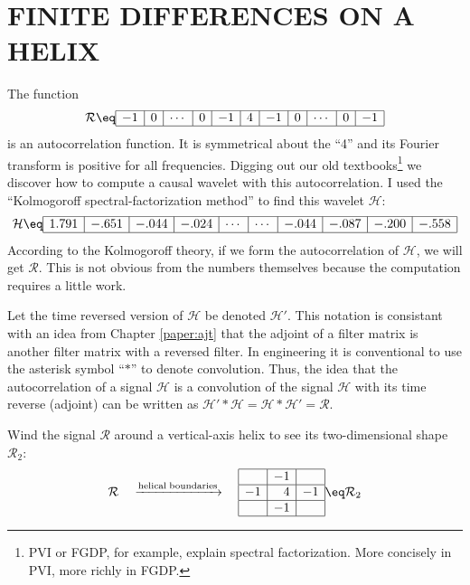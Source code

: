 \section{FINITE DIFFERENCES ON A HELIX}
The function
\begin{equation}
\label{eqn:2dlapin1d}
\mathcal{R}
\eq
\begin{array}{|r|r|r|r|r|r|r|r|r|r|r|r|r|r|r|} \hline
-1&0&\cdots&0&-1&4&-1&0& \cdots&0&-1
\\ \hline
\end{array}
\end{equation}
is an autocorrelation function.
It is symmetrical about the ``4'' and its Fourier transform
is positive for all frequencies.
Digging out our old textbooks\footnote{
        PVI or FGDP, for example,
        explain spectral factorization.
        More concisely in PVI, more richly in FGDP.
        }
we discover
how to compute a causal wavelet with this autocorrelation.
I used the ``Kolmogoroff spectral-factorization method''
to find this wavelet $\mathcal{H}$:
\begin{equation}
{\mathcal{H}}
\eq
\begin{array}{|r|r|r|r|r|r|r|r|r|r|r|r|r|r|r|}
\hline
1.791&-.651&-.044&-.024&\cdots&\cdots&-.044&-.087&-.200&-.558 \\
\hline
\end{array}
\label{eqn:lapfacrow}
\end{equation}
According to the Kolmogoroff theory,
if we form the autocorrelation of
$\mathcal{H}$,
we will get $\mathcal{R}$.
This is not obvious from the numbers themselves
because the computation requires a little work.
\par
Let the time reversed version of
$\mathcal{H}$
be denoted
$\mathcal {H}'$.
This notation is consistant with an idea from
Chapter \ref{paper:ajt} that the adjoint of a filter matrix
is another filter matrix with a reversed filter.
In engineering it is conventional to use the asterisk symbol
``$\ast$'' to denote convolution.
Thus, the idea that the autocorrelation of a 
signal $\mathcal{H}$
is a convolution of the
signal $\mathcal{H}$
with its time reverse (adjoint)
can be written as
$ \mathcal{H}' \ast \mathcal{H} = \mathcal{H} \ast \mathcal{H}' = \mathcal{R}$.



\par
Wind the signal $\mathcal{R}$ around a
vertical-axis helix to see its two-dimensional shape $\mathcal{R}_2$:
\begin{equation}
\mathcal{R}
\quad
\xrightarrow{\rm helical \; boundaries}
\quad
\begin{array}{|r|r|r|}  \hline
& -1 & \\
\hline
-1 & 4 & -1\\
\hline
& -1 & \\
\hline
\end{array}
\eq
\mathcal{R}_2
\label{eqn:lap2d}
\end{equation}


